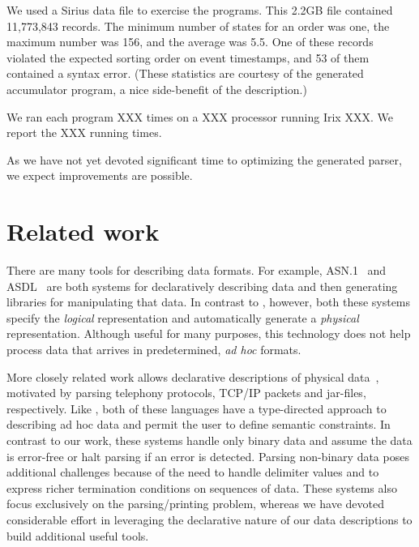 \documentclass{sig-alternate}
\newcommand{\dibbler}{Sirius}
\begin{document}
We used a \dibbler{} data file to exercise the programs.  This 2.2GB file contained 11,773,843 records.  The minimum number of states for an order was one, the maximum number was 156, and the average was 5.5.  One of these records violated the expected sorting order on event timestamps, and 53 of them contained a syntax error.
(These statistics are courtesy of the generated \pads{} accumulator program, a nice side-benefit of the \pads{} description.)  

We ran each program XXX times on a XXX processor running Irix XXX.   We report the XXX running times.


As
we have not yet devoted significant time to optimizing the generated parser,
we expect improvements are possible.

\section{Related work}
There are many tools for describing data formats. For example,
\textsc{ASN.1}~\cite{asn} and \textsc{ASDL}~\cite{asdl} are both
systems for declaratively describing data and then generating
libraries for manipulating that data.  In contrast to \pads{},
however, both these systems specify the {\em logical\/} representation
and automatically generate a {\em physical\/} representation.
Although useful for many purposes, this technology does not help
process data that arrives in predetermined, \textit{ad hoc} formats.


More closely related work allows declarative descriptions of physical
data~\cite{erlang,sigcomm00,gpce02}, motivated by parsing telephony protocols,
\textsc{TCP/IP} packets and \java{} jar-files, respectively.  Like
\pads{}, both of these languages have a type-directed approach to
describing ad hoc data and permit the user to define semantic constraints.
In contrast to our
work, these systems handle only binary data and assume the data is
error-free or halt parsing if an error is detected. 
Parsing non-binary data poses additional challenges because of the need
to handle delimiter values and to express richer termination conditions
on sequences of data. These systems also
focus exclusively on the parsing/printing problem, whereas we have 
devoted considerable effort in leveraging the declarative nature of
our data descriptions to build additional useful tools.
\end{document}
